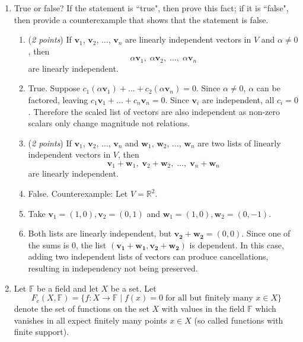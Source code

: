 \documentclass[11pt]{article}
\newcommand{\bbF}{\mathbb{F}}
\newcommand{\bbR}{\mathbb{R}}
\theoremstyle{definition}
\numberwithin{equation}{subsection}
\begin{document}
\begin{enumerate}
\item True or false? If the statement is ``true", then prove this fact; if it is ``false", then provide a counterexample that shows that the statement is false. 

\begin{enumerate}

\item[(a)] (\emph{2 points}) If $\mathbf{v}_1$, $\mathbf{v}_2$, $\dots$, $\mathbf{v}_n$ are linearly independent vectors in $V$ and $\alpha\neq0$, then 
$$\alpha\mathbf{v}_1,\; \alpha\mathbf{v}_2,\; \dots,\; \alpha\mathbf{v}_n$$
are linearly independent.
\item[] True. Suppose $c_1(\alpha \mathbf{v}_1)+...+c_2(\alpha \mathbf{v}_n)=0$. Since $\alpha \neq 0$, $\alpha$ can be factored, leaving $c_1\mathbf{v}_1+...+c_n\mathbf{v}_n=0$. Since $\mathbf{v}_i$ are independent, all $c_i=0$. Therefore the scaled list of vectors are also independent as non-zero scalars only change magnitude not relations.

\item[(b)] (\emph{2 points}) If $\mathbf{v}_1$, $\mathbf{v}_2$, $\dots$, $\mathbf{v}_n$ and $\mathbf{w}_1$, $\mathbf{w}_2$, $\dots$, $\mathbf{w}_n$ are two lists of linearly independent vectors in $V$, then 
$$\mathbf{v}_1+\mathbf{w}_1,\; \mathbf{v}_2+\mathbf{w}_2,\; \dots,\; \mathbf{v}_n+\mathbf{w}_n$$
are linearly independent. 
\item[] False. Counterexample: Let $V=\bbR^2$. 
\item[] Take $\mathbf{v}_1=(1,0), \mathbf{v}_2=(0,1)$ and $\mathbf{w}_1=(1,0), \mathbf{w}_2=(0,-1)$.  
\item[] Both lists are linearly independent, but $\mathbf{v_2} +\mathbf{w_2}=(0,0)$. Since one of the sums is 0, the list $(\mathbf{v_1}+\mathbf{w_1}, \mathbf{v_2}+\mathbf{w_2})$ is dependent. In this case, adding two independent lists of vectors can produce cancellations, resulting in independency not being preserved.

\end{enumerate}

\item Let $\bbF$ be a field and let $X$ be a set. Let 
$$F_c(X,\bbF) = \{f\colon X \to \bbF \; | \; f(x)=0 \; \text{for all but finitely many $x\in X$} \}$$
denote the set of functions on the set $X$ with values in the field $\bbF$ which vanishes in all expect finitely many points $x\in X$ (so called functions with finite support).


\end{enumerate}
\end{document}

